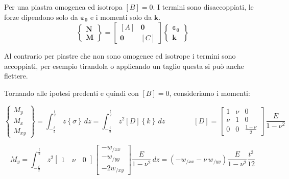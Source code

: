 Per una piastra omogenea ed isotropa $[B]=0$. I termini sono disaccoppiati, le forze dipendono solo da $\boldsymbol{\varepsilon_0}$ e i momenti solo da $\boldsymbol{k}$.
\begin{equation*}
\left\{
\begin{array}{c}
\boldsymbol{N}\\
\boldsymbol{M}
\end{array}
\right\}
=
\begin{bmatrix}
[A] & \boldsymbol{0} \\
\boldsymbol{0} & [C]
\end{bmatrix}
\left\{
\begin{array}{c}
\boldsymbol{\varepsilon_0}\\
\boldsymbol{k}
\end{array}
\right\}
\end{equation*}

Al contrario per piastre che non sono omogenee ed isotrope i termini sono accoppiati, per esempio tirandola o applicando un taglio questa si può anche flettere.

Tornando alle ipotesi predenti e quindi con $[B]=0$, consideriamo i momenti:


\begin{equation*}
    \left\{
\begin{array}{c}
M_y \\
M_x\\
M_{xy}
\end{array}
\right\} = \int_{-\frac{t}{2}}^{\frac{t}{2}}\,  z\left\{\sigma\right\} \,dz
 =\int_{-\frac{t}{2}}^{\frac{t}{2}}\,z^2 [D] \left\{k\right\} \,dz
\qquad \qquad [D]=
\left[
\begin{array}{ccc}
\displaystyle 1 & \displaystyle \nu & \displaystyle 0\\
\displaystyle \nu & \displaystyle 1 & \displaystyle 0 \\
\displaystyle 0& \displaystyle 0 & \displaystyle \frac{1-\nu}{2}
\end{array}
\right]\,
\frac{E}{1-\nu^2}
\end{equation*}

\begin{equation*}
   M_y =  \int_{-\frac{t}{2}}^{\frac{t}{2}}\,z^2 
   \left[\begin{array}{c}
1\quad\nu\quad0
\end{array} \right] 
   \left[
   \begin{array}{c}
-w_{/xx} \\-w_{/yy}\\-2w_{/xy}
\end{array} \right] \frac{E}{1-\nu^2}\,dz
=(-w_{/xx} -\nu \,w_{/yy}) \frac{E}{1-\nu^2}\frac{t^3}{12}
\end{equation*}

